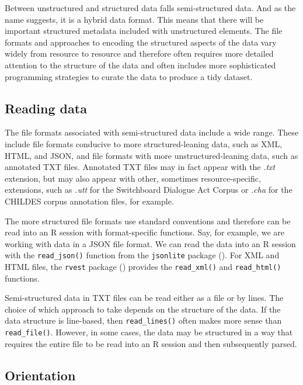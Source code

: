 \documentclass[
  letterpaper,
  DIV=11,
  numbers=noendperiod]{scrreprt}
\theoremstyle{definition}
\theoremstyle{remark}
\begin{document}
Between unstructured and structured data falls semi-structured data. And
as the name suggests, it is a hybrid data format. This means that there
will be important structured metadata included with unstructured
elements. The file formats and approaches to encoding the structured
aspects of the data vary widely from resource to resource and therefore
often requires more detailed attention to the structure of the data and
often includes more sophisticated programming strategies to curate the
data to produce a tidy dataset.

\subsection{Reading data}\label{reading-data-1}

The file formats associated with semi-structured data include a wide
range. These include file formats conducive to more structured-leaning
data, such as XML, HTML, and JSON, and file formats with more
unstructured-leaning data, such as annotated TXT files. Annotated TXT
files may in fact appear with the \emph{.txt} extension, but may also
appear with other, sometimes resource-specific, extensions, such as
\emph{.utt} for the Switchboard Dialogue Act Corpus or \emph{.cha} for
the CHILDES corpus annotation files, for example.

The more structured file formats use standard conventions and therefore
can be read into an R session with format-specific functions. Say, for
example, we are working with data in a JSON file format. We can read the
data into an R session with the \texttt{read\_json()} function from the
\texttt{jsonlite} package (). For
XML and HTML files, the \texttt{rvest} package
() provides the \texttt{read\_xml()}
and \texttt{read\_html()} functions.

Semi-structured data in TXT files can be read either as a file or by
lines. The choice of which approach to take depends on the structure of
the data. If the data structure is line-based, then
\texttt{read\_lines()} often makes more sense than
\texttt{read\_file()}. However, in some cases, the data may be
structured in a way that requires the entire file to be read into an R
session and then subsequently parsed.

\subsection{Orientation}\label{sec-cd-semi-structured-orientation}
\end{document}
